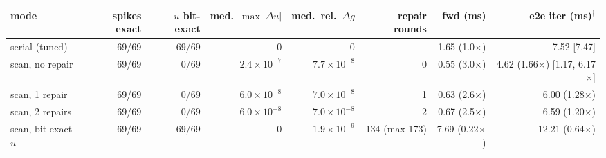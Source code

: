 \begin{tabular}{lrrrrrrr}
\toprule
mode & spikes exact & $u$ bit-exact & med.\ $\max|\Delta u|$ & med.\ rel.\ $\Delta g$ & repair rounds & fwd (ms) & e2e iter (ms)$^\dagger$\\
\midrule
serial (tuned) & 69/69 & 69/69 & 0 & 0 & -- & 1.65 (1.0$\times$) & 7.52 [7.47]\\
scan, no repair & 69/69 & 0/69 & $2.4\times10^{-7}$ & $7.7\times10^{-8}$ & 0 & 0.55 (3.0$\times$) & 4.62 (1.66$\times$) [1.17, 6.17$\times$]\\
scan, 1 repair & 69/69 & 0/69 & $6.0\times10^{-8}$ & $7.0\times10^{-8}$ & 1 & 0.63 (2.6$\times$) & 6.00 (1.28$\times$)\\
scan, 2 repairs & 69/69 & 0/69 & $6.0\times10^{-8}$ & $7.0\times10^{-8}$ & 2 & 0.67 (2.5$\times$) & 6.59 (1.20$\times$)\\
scan, bit-exact $u$ & 69/69 & 69/69 & 0 & $1.9\times10^{-9}$ & 134 (max 173) & 7.69 (0.22$\times$) & 12.21 (0.64$\times$)\\
\bottomrule
\end{tabular}
